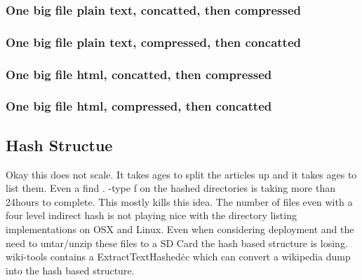 \documentclass{article}
\begin{document}
\subsubsection{One big file plain text, concatted, then compressed}
\subsubsection{One big file plain text, compressed, then concatted}
\subsubsection{One big file html, concatted, then compressed}
\subsubsection{One big file html, compressed, then concatted}

\subsection{Hash Structue}
Okay this does not scale. It takes ages to split the articles up and it takes
ages to list them. Even a find . -type f on the hashed directories is taking more
than 24hours to complete. This mostly kills this idea. The number of files even
with a four level indirect hash is not playing nice with the directory listing
implementations on OSX and Linux. Even when considering deployment and the need
to untar/unzip these files to a SD Card the hash based structure is losing.\\
wiki-tools contains a ExtractTextHashed\.cc which can convert a wikipedia dump
into the hash based structure.
\end{document}
